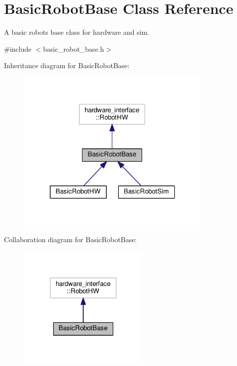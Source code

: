 \hypertarget{classBasicRobotBase}{}\section{Basic\+Robot\+Base Class Reference}
\label{classBasicRobotBase}


A basic robot\textquotesingle{}s base class for hardware and sim.  




{\ttfamily \#include $<$basic\+\_\+robot\+\_\+base.\+h$>$}



Inheritance diagram for Basic\+Robot\+Base\+:
\nopagebreak
\begin{figure}[H]
\begin{center}
\leavevmode
\includegraphics[width=268pt]{classBasicRobotBase__inherit__graph}
\end{center}
\end{figure}


Collaboration diagram for Basic\+Robot\+Base\+:
\nopagebreak
\begin{figure}[H]
\begin{center}
\leavevmode
\includegraphics[width=179pt]{classBasicRobotBase__coll__graph}
\end{center}
\end{figure}
